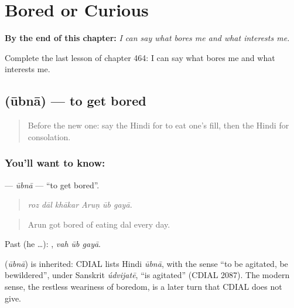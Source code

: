 
\chapter{Bored or Curious}
\label{ch:hi-bored-or-curious}

\begin{chapteropening}
\textbf{By the end of this chapter:} \emph{I can say what bores me and what interests me.}

Complete the last lesson of chapter 464: I can say what bores me and what interests me.
\end{chapteropening}

\section[\texorpdfstring{\hi{ऊबना} (ūbnā)}{ऊबना (ūbnā)}]{ (ūbnā) — to get bored}

\label{lesson:HI-C464-ubna}



\begin{quote}
Before the new one: say the Hindi for to eat one's fill, then the Hindi for consolation.
\end{quote}

\subsection*{You'll want to know: }
\textbf{} — \emph{ūbnā} — \textquotedblleft{}to get bored\textquotedblright{}.

\begin{quote}
     
\end{quote}

\begin{quote}
\emph{roz dāl khākar Aruṇ ūb gayā.}
\end{quote}

\begin{quote}
Arun got bored of eating dal every day.
\end{quote}

Past (he …):   , \emph{vah ūb gayā}.

\begin{cousinweb}
\textbf{} (\emph{ūbnā}) is inherited: CDIAL lists Hindi \emph{ūbnā}, with the sense \textquotedblleft{}to be agitated, be bewildered\textquotedblright{}, under Sanskrit \emph{údvijatē}, \textquotedblleft{}is agitated\textquotedblright{} (CDIAL 2087). The modern sense, the restless weariness of boredom, is a later turn that CDIAL does not give.
\end{cousinweb}

